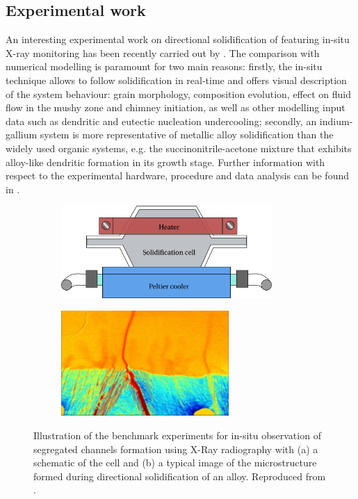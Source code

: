 \subsection{Experimental work} 
\label{sec:freckle_exp}
An interesting experimental work on directional solidification of 
featuring in-situ X-ray monitoring has been recently carried out by \citet{shevchenko_chimney_2013}. 
The comparison with numerical modelling is paramount for two main reasons: firstly, the in-situ technique allows to follow solidification in real-time 
and offers visual description of the system behaviour: grain morphology, composition evolution, effect on fluid flow in the 
mushy zone and chimney initiation, as well as other modelling input data such as dendritic and eutectic nucleation undercooling; 
secondly, an indium-gallium system is more representative of metallic alloy solidification than the widely used organic systems, 
e.g. the succinonitrile-acetone mixture that exhibits alloy-like dendritic formation in its growth stage. Further information with respect 
to the experimental hardware, procedure and data analysis can be found in \citep{boden_x-ray_2008,shevchenko_chimney_2013}.
%
\begin{figure}[htbp]
\centering
  \begin{subfigure}{0.5\textwidth}
    \centering
	\includegraphics[height=3.5cm]{Chapter3/Graphics/freckle_exp/setup.pdf}
	\caption{}
    \label{fig:experimental_setup}
  \end{subfigure}
  \begin{subfigure}{0.5\textwidth}
    \centering
	\includegraphics[height=4cm]{Chapter3/Graphics/freckle_exp/img.png}
	\caption{}
    \label{fig:experimental_img}
  \end{subfigure}
\caption{Illustration of the benchmark experiments for in-situ observation of segregated channels
formation using X-Ray radiography with (a) a schematic of the cell and (b) a typical image 
of the microstructure formed during directional solidification of an  alloy. Reproduced from \citep{shevchenko_chimney_2013}.} 
\label{fig:experimental_freckles}
\end{figure}
%
